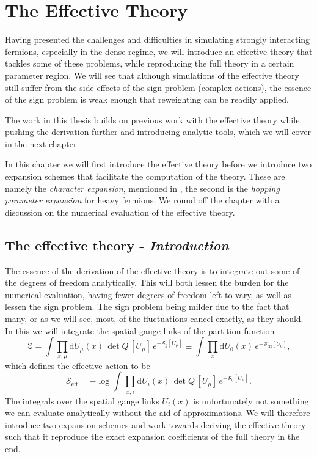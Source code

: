 \chapter{The Effective Theory}

Having presented the challenges and difficulties in simulating strongly
interacting fermions, especially in the dense regime, we will introduce an
effective theory that tackles some of these problems, while reproducing the full
theory in a certain parameter region. We will see that although simulations of
the effective theory still suffer from the side effects of the sign problem
(complex actions), the essence of the sign problem is weak enough that
reweighting can be readily applied.

The work in this thesis builds on previous work with the effective theory while
pushing the derivation further and introducing analytic tools, which we will
cover in the next chapter.

In this chapter we will first introduce the effective theory before we introduce
two expansion schemes that facilitate the computation of the theory. These are
namely the \emph{character expansion}, mentioned in ,
the second is the \emph{hopping parameter expansion} for heavy fermions. We
round off the chapter with a discussion on the numerical evaluation of the
effective theory.

\section{The effective theory - \texorpdfstring{\itshape Introduction}{Introduction}}

The essence of the derivation of the effective theory is to integrate out some
of the degrees of freedom analytically. This will both lessen the burden for the
numerical evaluation, having fewer degrees of freedom left to vary, as well as
lessen the sign problem. The sign problem being milder due to the fact that
many, or as we will see, most, of the fluctuations cancel exactly, as they
should. In this we will integrate the spatial gauge links of the partition
function
%
\begin{equation}
  \mathcal{Z} = \int \prod_{x, \mu} \mathrm{d} U_{\mu}(x) \, \det Q \, [U_{\mu}] \,
    e^{-\mathcal{S}_g[U_{\mu}]}
    \equiv \int \prod_{x} \mathrm{d} U_0(x) \,
    e^{-\mathcal{S}_{\text{eff}}[U_0]},
\end{equation}
%
which defines the effective action to be
%
\begin{equation} \label{eq:eff_action_def}
  \mathcal{S}_{\text{eff}} = - \log \int \prod_{x, i} \mathrm{d} U_i(x) \, \det
    Q \, [U_{\mu}] \, e^{-\mathcal{S}_g [U_{\mu}]}.
\end{equation}
%
The integrals over the spatial gauge links $U_i(x)$ is unfortunately not
something we can evaluate analytically without the aid of approximations. We
will therefore introduce two expansion schemes and work towards deriving the
effective theory such that it reproduce the exact expansion coefficients of the
full theory in the end.

